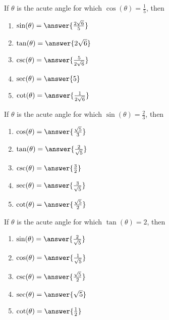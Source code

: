 \documentclass{ximera}
\author{Kenneth Berglund}
\begin{document}
\begin{exercise}

  If $\theta$ is the acute angle for which $\cos(\theta)=\frac{1}{5}$, then 

	\begin{enumerate}
		\item $\sin(\theta) = \answer{\frac{2\sqrt{6}}{5}}$
		\item $\tan(\theta) = \answer{2\sqrt{6}}$
		\item $\csc(\theta) = \answer{\frac{5}{2\sqrt{6}}}$
		\item $\sec(\theta) = \answer{5}$
		\item $\cot(\theta) = \answer{\frac{1}{2\sqrt{6}}}$
	\end{enumerate}

\end{exercise}

\begin{exercise}

  If $\theta$ is the acute angle for which $\sin(\theta)=\frac{2}{3}$, then 

	\begin{enumerate}
		\item $\cos(\theta) = \answer{\frac{\sqrt{5}}{3}}$
		\item $\tan(\theta) = \answer{\frac{2}{\sqrt{5}}}$
		\item $\csc(\theta) = \answer{\frac{3}{2}}$
		\item $\sec(\theta) = \answer{\frac{3}{\sqrt{5}}}$
		\item $\cot(\theta) = \answer{\frac{\sqrt{5}}{2}}$
	\end{enumerate}

\end{exercise}

\begin{exercise}

  If $\theta$ is the acute angle for which $\tan(\theta)= 2$, then 

	\begin{enumerate}
		\item $\sin(\theta) = \answer{\frac{2}{\sqrt{5}}}$
		\item $\cos(\theta) = \answer{\frac{1}{\sqrt{5}}}$
		\item $\csc(\theta) = \answer{\frac{\sqrt{5}}{2}}$
		\item $\sec(\theta) = \answer{\sqrt{5}}$
		\item $\cot(\theta) = \answer{\frac{1}{2}}$
	\end{enumerate}

\end{exercise}
\end{document}
